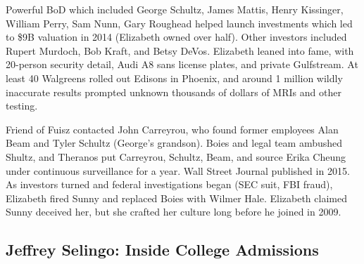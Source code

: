 \documentclass[
]{article}
\begin{document}
Powerful BoD which included George Schultz, James Mattis, Henry
Kissinger, William Perry, Sam Nunn, Gary Roughead helped launch
investments which led to \$9B valuation in 2014 (Elizabeth owned over
half). Other investors included Rupert Murdoch, Bob Kraft, and Betsy
DeVos. Elizabeth leaned into fame, with 20-person security detail, Audi
A8 sans license plates, and private Gulfstream. At least 40 Walgreens
rolled out Edisons in Phoenix, and around 1 million wildly inaccurate
results prompted unknown thousands of dollars of MRIs and other testing.

Friend of Fuisz contacted John Carreyrou, who found former employees
Alan Beam and Tyler Schultz (George's grandson). Boies and legal team
ambushed Shultz, and Theranos put Carreyrou, Schultz, Beam, and source
Erika Cheung under continuous surveillance for a year. Wall Street
Journal published in 2015. As investors turned and federal
investigations began (SEC suit, FBI fraud), Elizabeth fired Sunny and
replaced Boies with Wilmer Hale. Elizabeth claimed Sunny deceived her,
but she crafted her culture long before he joined in 2009.

\hypertarget{jeffrey-selingo-inside-college-admissions}{%
\subsection{Jeffrey Selingo: Inside College
Admissions}\label{jeffrey-selingo-inside-college-admissions}}
\end{document}
